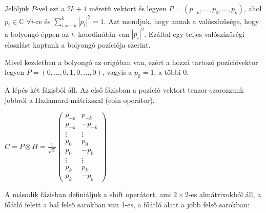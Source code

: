 Jelöljük $P$-vel ezt a $2k+1$ méretű vektort és legyen $P=(p_{-k},...,p_0,...,p_{k})$,
ahol $p_i\in\mathds{C}$ $\forall i$-re és $\sum\limits_{i=-k}^{k}|p_i|^2 = 1$. Azt mondjuk, hogy
annak a valószínűsége, hogy a bolyongó éppen az $i.$ koordinátán van $|p_i|^2$. Ezáltal egy
teljes valószínűségi eloszlást kaptunk a bolyongó pozíciója szerint.

Mivel kezdetben a bolyongó az origóban van, ezért a hozzá tartozó pozícióvektor legyen
$P = (0,...,0,1,0,...,0)$, vagyis a $p_0=1$, a többi $0$.

A lépés két fázisból áll. Az első fázisban a pozíció vektort
tenzor-szorozzunk jobbról a Hadamard-mátrixszal (coin operátor).

\begin{center}
  $C = P \otimes H = \frac{1}{\sqrt{2}}\begin{pmatrix}
      p_{-k} & p_{-k}  \\
      p_{-k} & -p_{-k} \\
      \vdots & \vdots  \\
      p_{0}  & p_{0}   \\
      p_{0}  & -p_{0}  \\
      \vdots & \vdots  \\
      p_{k}  & p_{k}   \\
      p_{k}  & -p_{k}
    \end{pmatrix}
  $
\end{center}

A második fázisban definiáljuk a shift operátort, ami $2 \times 2$-es almátrixokból áll, a főátló felett a bal felső
sarokban van 1-es, a főátló alatt a jobb felső sarokban:


